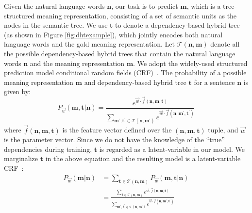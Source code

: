 Given the natural language words $\boldsymbol{n}$, our task is to predict  $\boldsymbol{m}$, which is a tree-structured meaning representation, consisting of a set of semantic units as the nodes in the semantic tree. 
We use  $\boldsymbol{t}$ to denote a dependency-based hybrid tree (as shown in Figure \ref{fig:dhtexample}), which jointly encodes both natural language words and the gold meaning representation.  
Let $\mathcal{T}(\boldsymbol{n}, \boldsymbol{m})$ denote all the possible dependency-based hybrid trees that contain the natural language words $\boldsymbol{n}$ and the meaning representation $\boldsymbol{m}$. 
We adopt the widely-used structured prediction model conditional random fields (CRF)~\cite{lafferty2001conditional}. 
The  probability of a possible meaning representation $\boldsymbol{m}$ and dependency-based hybrid tree $\boldsymbol{t}$ for a sentence $\boldsymbol{n}$ is given by:
\begin{equation}
P_\vec{w} (\boldsymbol{m}, \boldsymbol{t} | \boldsymbol{n}) 
= 
\frac{
	e ^{\vec{w}\cdot \vec{f} (\boldsymbol{n}, \boldsymbol{m}, \boldsymbol{t})}
}
{
	\sum_{\boldsymbol{m}^\prime, \boldsymbol{t}^\prime \in \mathcal{T}(\boldsymbol{n}, \boldsymbol{m}^\prime )} 
	e^{\vec{w} \cdot \vec{f} (\boldsymbol{n}, \boldsymbol{m}^\prime, \boldsymbol{t}^\prime)}
}\nonumber
\label{equ:joint}
\end{equation}
where $\vec{f}(\boldsymbol{n}, \boldsymbol{m}, \boldsymbol{t})$ is the feature vector defined over the $(\boldsymbol{n}, \boldsymbol{m}, \boldsymbol{t})$ tuple,
and $\vec{w}$ is the parameter vector.
Since we do not have the knowledge of the ``true'' dependencies during training, $\boldsymbol{t}$ is regarded as a latent-variable in our model. 
We marginalize $\boldsymbol{t}$ in the above equation and the resulting model is a latent-variable CRF~\cite{quattoni2005conditional}:
\begin{equation}
\begin{split}
P_\vec{w} (\boldsymbol{m} | \boldsymbol{n}) 
&= 
\sum_{\boldsymbol{t} \in \mathcal{T} (\boldsymbol{n}, \boldsymbol{m}) }  
P_\vec{w} (\boldsymbol{m}, \boldsymbol{t} | \boldsymbol{n})  \\
& = \frac{
	\sum_{\boldsymbol{t} \in \mathcal{T} (\boldsymbol{n}, \boldsymbol{m}) }	
	e ^{\vec{w} \cdot \vec{f} (\boldsymbol{n}, \boldsymbol{m}, \boldsymbol{t})}
}
{
	\sum_{\boldsymbol{m}^\prime, \boldsymbol{t}^\prime \in \mathcal{T}(\boldsymbol{n}, \boldsymbol{m}^\prime )} 
	e^{\vec{w} \cdot \vec{f} (\boldsymbol{n}, \boldsymbol{m}^\prime, \boldsymbol{t}^\prime)}
}
\end{split}
\label{equ:latent}
\end{equation}

